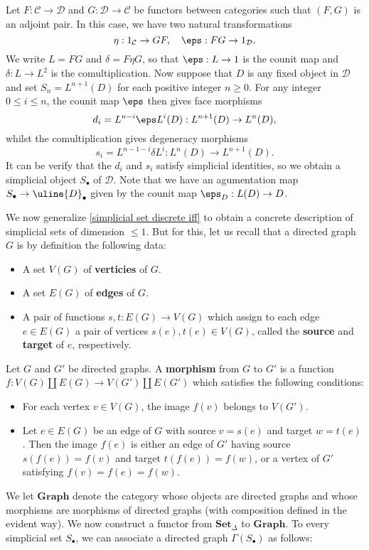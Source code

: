 \begin{example}\label{simplicial set from adjoint pair}
Let $F:\mathcal{C}\to\mathcal{D}$ and $G:\mathcal{D}\to\mathcal{C}$ be functors between categories such that $(F,G)$ is an adjoint pair. In this case, we have two natural transformations
\[\eta:1_{\mathcal{C}}\to GF,\quad \eps:FG\to 1_{\mathcal{D}}.\]
We write $L=FG$ and $\delta=F\eta G$, so that $\eps:L\to 1$ is the counit map and $\delta:L\to L^2$ is the comultiplication. Now suppose that $D$ is any fixed object in $\mathcal{D}$ and set $S_n=L^{n+1}(D)$ for each positive integer $n\geq 0$. For any integer $0\leq i\leq n$, the counit map $\eps$ then gives face morphisms
\[d_i=L^{n-i}\eps L^i(D):L^{n+1}(D)\to L^n(D),\]
whilst the comultiplication gives degeneracy morphisms
\[s_i=L^{n-1-i}\delta L^i:L^n(D)\to L^{n+1}(D).\]
It can be verify that the $d_i$ and $s_i$ satisfy simplicial identities, so we obtain a simplicial object $S_\bullet$ of $\mathcal{D}$. Note that we have an agumentation map $S_\bullet\to\uline{D}_\bullet$ given by the counit map $\eps_D:L(D)\to D$.
\end{example}
We now generalize \cref{simplicial set discrete iff} to obtain a concrete description of simplicial sets of dimension $\leq 1$. But for this, let us recall that a directed graph $G$ is by definition the following data:
\begin{itemize}
\item A set $V(G)$ of \textbf{verticies} of $G$.
\item A set $E(G)$ of \textbf{edges} of $G$.
\item A pair of functions $s,t:E(G)\to V(G)$ which assign to each edge $e\in E(G)$ a pair of vertices $s(e),t(e)\in V(G)$, called the \textbf{source} and \textbf{target} of $e$, respectively.
\end{itemize}
Let $G$ and $G'$ be directed graphs. A \textbf{morphism} from $G$ to $G'$ is a function $f:V(G)\amalg E(G)\to V(G')\amalg E(G')$ which satisfies the following conditions:
\begin{itemize}
\item For each vertex $v\in V(G)$, the image $f(v)$ belongs to $V(G')$.
\item Let $e\in E(G)$ be an edge of $G$ with source $v=s(e)$ and target $w=t(e)$. Then the image $f(e)$ is either an edge of $G'$ having source $s(f(e))=f(v)$ and target $t(f(e))=f(w)$, or a vertex of $G'$ satisfying $f(v)=f(e)=f(w)$.
\end{itemize}
We let $\mathbf{Graph}$ denote the category whose objects are directed graphs and whose morphisms are morphisms of directed graphs (with composition defined in the evident way). We now construct a functor from $\mathbf{Set}_\Delta$ to $\mathbf{Graph}$. To every simplicial set $S_\bullet$, we can associate a directed graph $\Gamma(S_\bullet)$ as follows:

